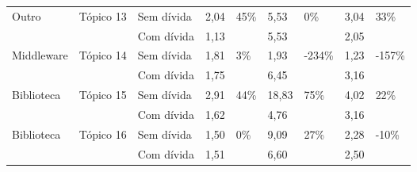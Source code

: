 \begin{longtable}{|l|l|l|l|l|l|l|l|l|}
\multirow{2}{*}{Outro}         & \multirow{2}{*}{Tópico 13} & Sem dívida              & 2,04            & \multirow{2}{*}{45\%}   & 5,53            & \multirow{2}{*}{0\%}     & 3,04            & \multirow{2}{*}{33\%}   \\ \cline{3-4} \cline{6-6} \cline{8-8}
                               &                            & Com dívida           & 1,13            &                         & 5,53            &                          & 2,05            &                         \\ \hline
\multirow{2}{*}{Middleware}    & \multirow{2}{*}{Tópico 14} & Sem dívida              & 1,81            & \multirow{2}{*}{3\%}    & 1,93            & \multirow{2}{*}{-234\%}  & 1,23            & \multirow{2}{*}{-157\%} \\ \cline{3-4} \cline{6-6} \cline{8-8}
                               &                            & Com dívida           & 1,75            &                         & 6,45            &                          & 3,16            &                         \\ \hline
                               

\multirow{2}{*}{Biblioteca}    & \multirow{2}{*}{Tópico 15} & Sem dívida              & 2,91            & 44\%                    & 18,83           & \multirow{2}{*}{75\%}    & 4,02            & \multirow{2}{*}{22\%}   \\ \cline{3-6} \cline{8-8}
                               &                            & Com dívida           & 1,62            &                         & 4,76            &                          & 3,16            &                         \\ \hline
\multirow{2}{*}{Biblioteca}    & \multirow{2}{*}{Tópico 16} & Sem dívida              & 1,50            & \multirow{2}{*}{0\%}    & 9,09            & \multirow{2}{*}{27\%}    & 2,28            & \multirow{2}{*}{-10\%}  \\ \cline{3-4} \cline{6-6} \cline{8-8}
                               &                            & Com dívida           & 1,51            &                         & 6,60            &                          & 2,50            &                         \\ \hline


\end{longtable}
